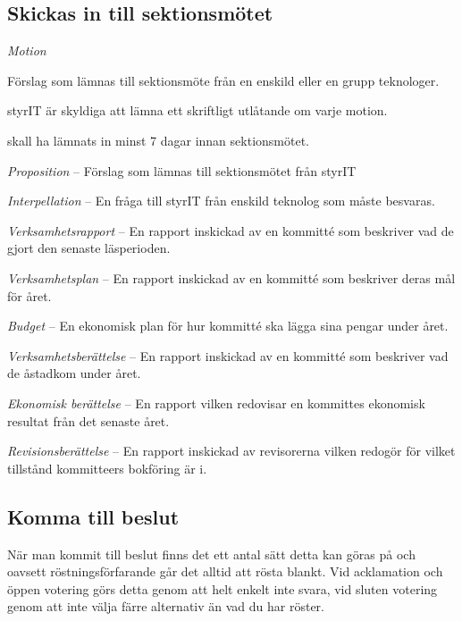 \documentclass[11pt, noincludeaddress]{classes/cthit}
\let\tempone\itemize
\let\temptwo\enditemize
\renewenvironment{itemize}{\tempone\addtolength{\itemsep}{-0.3\baselineskip}}{\temptwo}
\begin{document}
\subsection{Skickas in till sektionsmötet}
\begin{itemize}
    \item \textit{Motion}
    \begin{itemize}
        \item Förslag som lämnas till sektionsmöte från en enskild eller en grupp teknologer.
        \item styrIT är skyldiga att lämna ett skriftligt utlåtande om varje motion.
        \item skall ha lämnats in minst 7 dagar innan sektionsmötet.
    \end{itemize}
    \item \textit{Proposition} -- Förslag som lämnas till sektionsmötet från styrIT
    \item \textit{Interpellation} -- En fråga till styrIT från enskild teknolog som måste besvaras.
    \item \textit{Verksamhetsrapport} -- En rapport inskickad av en kommitté som beskriver vad de gjort den senaste läsperioden.
    \item \textit{Verksamhetsplan} -- En rapport inskickad av en kommitté som beskriver deras mål för året.
    \item \textit{Budget} -- En ekonomisk plan för hur kommitté ska lägga sina pengar under året.
    \item \textit{Verksamhetsberättelse} -- En rapport inskickad av en kommitté som beskriver vad de åstadkom under året.
    \item \textit{Ekonomisk berättelse} -- En rapport vilken redovisar en kommittes ekonomisk resultat från det senaste året.
    \item \textit{Revisionsberättelse} -- En rapport inskickad av revisorerna vilken redogör för vilket tillstånd kommitteers bokföring är i.
    
\end{itemize}

\subsection{Komma till beslut}
När man kommit till beslut finns det ett antal sätt detta kan göras på och oavsett röstningsförfarande går det alltid att rösta blankt. Vid acklamation och öppen votering görs detta genom att helt enkelt inte svara, vid sluten votering genom att inte välja färre alternativ än vad du har röster.
\end{document}
